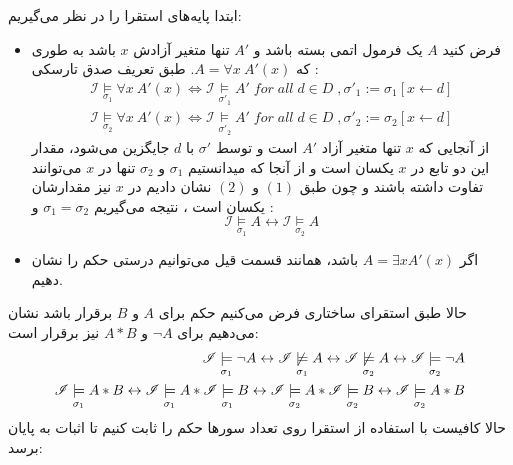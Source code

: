 \documentclass[]{exam}
\begin{document}
ابتدا پایه‌های استقرا را در نظر می‌گیریم:
\begin{itemize}
    \item فرض کنید $A$ یک فرمول اتمی بسته باشد و $A'$ تنها متغیر آزادش $x$ باشد به طوری که
    $A = \forall x \: A'(x)$.
    طبق تعریف صدق تارسکی :
    \begin{align}
        \mathscr{I} \underset{\sigma_1}{\models} \forall x \: A'(x) \Longleftrightarrow
        \mathscr{I} \underset{\sigma'_1}{\models} A' \; for \; all \; d \in D \;, \sigma'_1 := \sigma_1[x \leftarrow d] \\
        \mathscr{I} \underset{\sigma_2}{\models} \forall x \: A'(x) \Longleftrightarrow
        \mathscr{I} \underset{\sigma'_2}{\models} A' \; for \; all \; d \in D \;, \sigma'_2 := \sigma_2[x \leftarrow d]
    \end{align}
    از آنجایی که $x$ تنها متغیر آزاد $A'$ است و توسط $\sigma'$ با $d$ جایگزین می‌شود،
    مقدار این دو تابع در $x$ یکسان است
    و از آنجا که میدانستیم $\sigma_1$ و $\sigma_2$ تنها در $x$ می‌توانند تفاوت داشته باشند
    و چون طبق $(1)$ و $(2)$ نشان دادیم در $x$ نیز مقدارشان یکسان است
    ، نتیجه می‌گیریم $\sigma_1 = \sigma_2$ و :
    $$\mathscr{I} \underset{\sigma_1}{\models} A \longleftrightarrow \mathscr{I} \underset{\sigma_2}{\models} A$$
    \item اگر $A = \exists x A'(x)$ باشد، همانند قسمت قیل می‌توانیم درستی حکم را نشان دهیم.
\end{itemize}
حالا طبق استقرای ساختاری فرض می‌کنیم حکم برای $A$ و $B$
برقرار باشد نشان می‌دهیم برای $\neg A$ و $A * B$ نیز برقرار است:
\begin{align}
    \mathscr{I} \underset{\sigma_1}{\models} \neg A \leftrightarrow 
    \mathscr{I} \not \underset{\sigma_1}{\models} A \leftrightarrow 
    \mathscr{I} \not \underset{\sigma_2}{\models} A \leftrightarrow 
    \mathscr{I} \underset{\sigma_2}{\models} \neg A \\
    \mathscr{I} \underset{\sigma_1}{\models} A * B \leftrightarrow
    \mathscr{I} \underset{\sigma_1}{\models} A * \mathscr{I} \underset{\sigma_1}{\models}  B \leftrightarrow
    \mathscr{I} \underset{\sigma_2}{\models} A * \mathscr{I} \underset{\sigma_2}{\models}  B \leftrightarrow
    \mathscr{I} \underset{\sigma_2}{\models} A * B
\end{align}
حالا کافیست با استفاده از استقرا روی تعداد سورها حکم را ثابت کنیم تا اثبات به پایان برسد:
\end{document}
